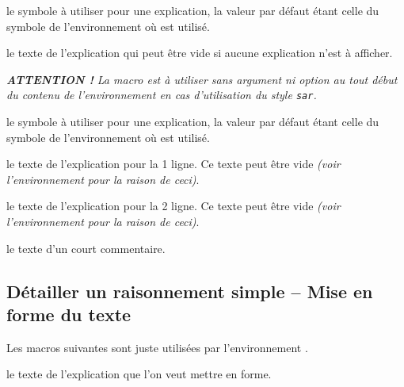 \documentclass[12pt,a4paper]{article}
\begin{document}
\separation


  \hfill {}

\IDoption{} le symbole à utiliser pour une explication, la valeur par défaut étant celle du symbole de l'environnement  où  est utilisé.

\IDarg{} le texte de l'explication qui peut être vide si aucune explication n'est à afficher.

\medskip

\medskip

\emph{\textbf{ATTENTION !} La macro  est à utiliser sans argument ni option au tout début du contenu de l'environnement  en cas d'utilisation du style \texttt{sar}.}


\separation



\IDoption{} le symbole à utiliser pour une explication, la valeur par défaut étant celle du symbole de l'environnement  où  est utilisé.

 le texte de l'explication pour la 1\iere{} ligne.
          Ce texte peut être vide \emph{(voir l'environnement  pour la raison de ceci)}.

 le texte de l'explication pour la 2\ieme{} ligne.
          Ce texte peut être vide \emph{(voir l'environnement  pour la raison de ceci)}.


\separation


  \hfill {}



\IDarg{} le texte d'un court commentaire.




\subsection{Détailler un raisonnement simple -- Mise en forme du texte}

Les macros suivantes sont juste utilisées par l'environnement .


\separation




\separation



\IDarg{} le texte de l'explication que l'on veut mettre en forme.
\end{document}
